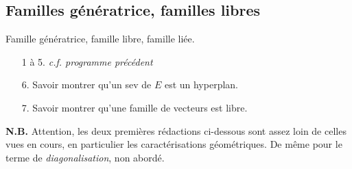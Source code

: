 \documentclass[a4paper,french,bookmarks]{article}
\begin{document}
\subsection*{Familles génératrice, familles libres}

\begin{enumerate}
    \ithand Famille génératrice, famille libre, famille liée.
\end{enumerate}

\savoirfaire

\begin{enumerate}
    \item[1 à 5.] \textit{c.f. programme précédent}
    
    \item[6.] Savoir montrer qu’un sev de $E$ est un hyperplan.
    
    \item[7.] Savoir montrer qu’une famille de vecteurs est libre.
\end{enumerate}

\questionsdecours

\textbf{\sffamily N.B.} Attention, les deux premières rédactions
ci-dessous sont assez loin de celles vues en cours, en particulier les
caractérisations géométriques. De même pour le terme de
\textit{diagonalisation}, non abordé. 
\end{document}
